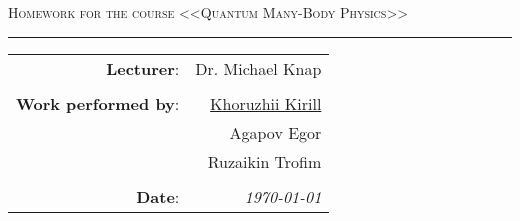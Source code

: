 
\begin{center}
    \LARGE \textsc{Homework for the course <<Quantum Many-Body Physics>>}
\end{center}

\hrule

\phantom{42}

\begin{flushright}
    \begin{tabular}{rr}
        \textbf{Lecturer}: 
        & Dr. Michael Knap \\
        & \\
        \textbf{Work performed by}: 
        & \underline{Khoruzhii Kirill} \\
        & Agapov Egor \\
        & Ruzaikin Trofim \\
        & \\
        \textbf{Date}: &
        \textit{\today}\\
    \end{tabular}
\end{flushright}

\thispagestyle{empty}
\tableofcontents
\newpage


